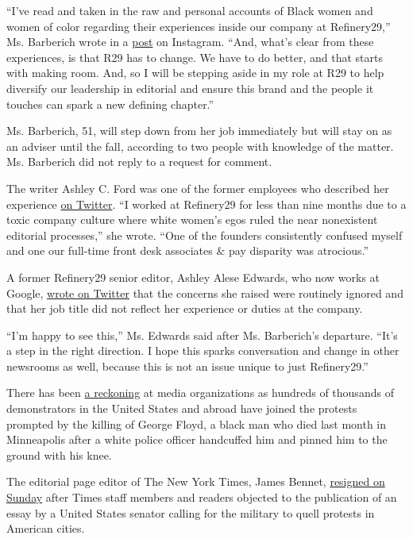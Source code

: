 ``I've read and taken in the raw and personal accounts of Black women
and women of color regarding their experiences inside our company at
Refinery29,'' Ms. Barberich wrote in a
\href{https://www.instagram.com/p/CBLToSInUcb/}{post} on Instagram.
``And, what's clear from these experiences, is that R29 has to change.
We have to do better, and that starts with making room. And, so I will
be stepping aside in my role at R29 to help diversify our leadership in
editorial and ensure this brand and the people it touches can spark a
new defining chapter.''

Ms. Barberich, 51, will step down from her job immediately but will stay
on as an adviser until the fall, according to two people with knowledge
of the matter. Ms. Barberich did not reply to a request for comment.

The writer Ashley C. Ford was one of the former employees who described
her experience
\href{https://twitter.com/iSmashFizzle/status/1268334753608065026}{on
Twitter}. ``I worked at Refinery29 for less than nine months due to a
toxic company culture where white women's egos ruled the near
nonexistent editorial processes,'' she wrote. ``One of the founders
consistently confused myself and one our full-time front desk associates
\& pay disparity was atrocious.''

A former Refinery29 senior editor, Ashley Alese Edwards, who now works
at Google,
\href{https://twitter.com/AshleyAlese/status/1269769432513077250?s=20}{wrote
on Twitter} that the concerns she raised were routinely ignored and that
her job title did not reflect her experience or duties at the company.

``I'm happy to see this,'' Ms. Edwards said after Ms. Barberich's
departure. ``It's a step in the right direction. I hope this sparks
conversation and change in other newsrooms as well, because this is not
an issue unique to just Refinery29.''

There has been
\href{https://www.nytimes3xbfgragh.onion/2020/06/07/business/media/new-york-times-washington-post-protests.html}{a
reckoning} at media organizations as hundreds of thousands of
demonstrators in the United States and abroad have joined the protests
prompted by the killing of George Floyd, a black man who died last month
in Minneapolis after a white police officer handcuffed him and pinned
him to the ground with his knee.

The editorial page editor of The New York Times, James Bennet,
\href{https://www.nytimes3xbfgragh.onion/2020/06/07/business/media/james-bennet-resigns-nytimes-op-ed.html}{resigned
on Sunday} after Times staff members and readers objected to the
publication of an essay by a United States senator calling for the
military to quell protests in American cities.

